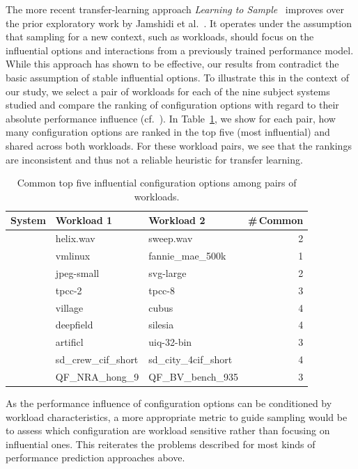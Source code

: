{{{The more recent transfer-learning approach \emph{Learning to Sample}~\cite{jamshidi_learning_2018} improves over the prior exploratory work by Jamshidi et al.~\cite{jamishidi_transfer_2017}. It operates under the assumption that sampling for a new context, such as workloads, should focus on the influential options and interactions from a previously trained performance model. While this approach has shown to be effective, our results from  contradict the basic assumption of stable influential options. 
To illustrate this in the context of our study, we select a pair of workloads for each of the nine subject systems studied and compare the ranking of configuration options with regard to their absolute performance influence (cf.~). In Table~\ref{tab:shared_options}, we show for each pair, how many configuration options are ranked in the top five (most influential) and shared across both workloads. For these workload pairs, we see that the rankings are inconsistent and thus not a reliable heuristic for transfer learning.
\begin{table}
	\centering
	\footnotesize
	\caption{Common top five influential configuration options among pairs of workloads.}
	\begin{tabular}{p{12mm}llr}
		\toprule
		\textbf{System} & \textbf{Workload 1} & \textbf{Workload 2} & \textbf{\#\,Common} \\
		\midrule
		\jumper & helix.wav & sweep.wav & 2\\
		\kanzi & vmlinux & fannie\_mae\_500k & 1\\
		\dconvert & jpeg-small & svg-large & 2\\
		\htwo & tpcc-2 & tpcc-8 & 3\\
		\batik & village & cubus & 4\\
		\midrule
		\xz & deepfield & silesia & 4\\
		\lrzip & artificl & uiq-32-bin & 3\\
		\xzwo & sd\_crew\_cif\_short &sd\_city\_4cif\_short & 4\\
		\zdrei & QF\_NRA\_hong\_9 & QF\_BV\_bench\_935 & 3\\
		\bottomrule
	\end{tabular}
\label{tab:shared_options}
\end{table}


As the performance influence of configuration options can be conditioned by workload characteristics, a more appropriate metric to guide sampling would be to assess which configuration are workload sensitive rather than focusing on influential ones. This reiterates the problems described for most kinds of performance prediction approaches above.

}}}
